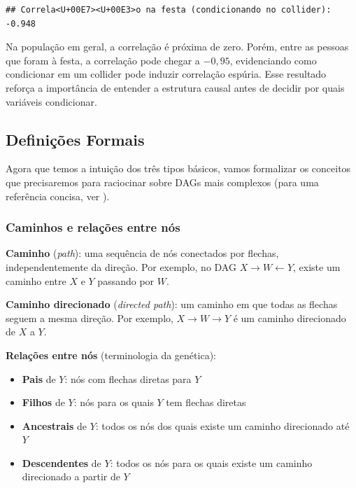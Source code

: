 \documentclass[
]{article}
\providecommand{\tightlist}{%
  \setlength{\itemsep}{0pt}\setlength{\parskip}{0pt}}
\begin{document}
\begin{verbatim}
## Correla<U+00E7><U+00E3>o na festa (condicionando no collider): -0.948
\end{verbatim}

Na população em geral, a correlação é próxima de zero. Porém, entre as pessoas que foram à festa, a correlação pode chegar a \(-0{,}95\), evidenciando como condicionar em um collider pode induzir correlação espúria. Esse resultado reforça a importância de entender a estrutura causal antes de decidir por quais variáveis condicionar.

\subsection{Definições Formais}\label{definiuxe7uxf5es-formais}

Agora que temos a intuição dos três tipos básicos, vamos formalizar os conceitos que precisaremos para raciocinar sobre DAGs mais complexos (para uma referência concisa, ver ).

\subsubsection{Caminhos e relações entre nós}\label{caminhos-e-relauxe7uxf5es-entre-nuxf3s}

\textbf{Caminho} (\emph{path}): uma sequência de nós conectados por flechas, independentemente da direção. Por exemplo, no DAG \(X \to W \leftarrow Y\), existe um caminho entre \(X\) e \(Y\) passando por \(W\).

\textbf{Caminho direcionado} (\emph{directed path}): um caminho em que todas as flechas seguem a mesma direção. Por exemplo, \(X \to W \to Y\) é um caminho direcionado de \(X\) a \(Y\).

\textbf{Relações entre nós} (terminologia da genética):

\begin{itemize}
\tightlist
\item
  \textbf{Pais} de \(Y\): nós com flechas diretas para \(Y\)
\item
  \textbf{Filhos} de \(Y\): nós para os quais \(Y\) tem flechas diretas
\item
  \textbf{Ancestrais} de \(Y\): todos os nós dos quais existe um caminho direcionado até \(Y\)
\item
  \textbf{Descendentes} de \(Y\): todos os nós para os quais existe um caminho direcionado a partir de \(Y\)
\end{itemize}
\end{document}
